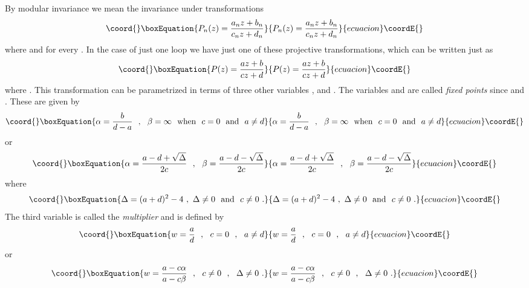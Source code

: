 \documentclass[a4paper,12pt]{article}
\begin{document}
By modular invariance we mean the invariance under transformations
\begin{equation}\coord{}\boxEquation{
P_n(z)=\frac{a_nz+b_n}{c_nz+d_n}
}{
P_n(z)=\frac{a_nz+b_n}{c_nz+d_n}
}{ecuacion}\coordE{}\end{equation}
where \coordHE{} and \coordHE{} for every \coordHE{}. In the case of just one loop we have just one of these projective transformations, which can be written just as
\begin{equation}\coord{}\boxEquation{
P(z)=\frac{az+b}{cz+d}
}{
P(z)=\frac{az+b}{cz+d}
}{ecuacion}\coordE{}\end{equation}
where \coordHE{}. This transformation can be parametrized in terms of three other variables
\myHighlight{$\alpha $}\coordHE{}, \myHighlight{$\beta $}\coordHE{} and \coordHE{}. The variables \myHighlight{$\alpha $}\coordHE{} and \myHighlight{$\beta $}\coordHE{} are called {\sl fixed
points} since \coordHE{} and \coordHE{}. These are given by
\begin{equation}\coord{}\boxEquation{
\alpha =\frac{b}{d-a}\ \ ,\ \ \beta =\infty \ \ {\rm when}\ \  c=0 \ \ {\rm and}\ \  a\neq d
}{
\alpha =\frac{b}{d-a}\ \ ,\ \ \beta =\infty \ \ {\rm when}\ \  c=0 \ \ {\rm and}\ \  a\neq d
}{ecuacion}\coordE{}\end{equation}
or
\begin{equation}\coord{}\boxEquation{
\alpha =\frac{a-d+\sqrt{\Delta }}{2c}\ \ ,\ \ \beta =\frac{a-d-\sqrt{\Delta }}{2c}
}{
\alpha =\frac{a-d+\sqrt{\Delta }}{2c}\ \ ,\ \ \beta =\frac{a-d-\sqrt{\Delta }}{2c}
}{ecuacion}\coordE{}\end{equation}
where
\begin{equation}\coord{}\boxEquation{
\Delta =(a+d)^2-4\ ,\ \Delta \neq 0 \ \ {\rm and}\ \  c\neq 0\ .
}{
\Delta =(a+d)^2-4\ ,\ \Delta \neq 0 \ \ {\rm and}\ \  c\neq 0\ .
}{ecuacion}\coordE{}\end{equation}
The third variable is called the {\sl multiplier} and is defined by
\begin{equation}\coord{}\boxEquation{
w=\frac{a}{d}\ \ ,\ \ c=0\ \ ,\ \ a\neq d
}{
w=\frac{a}{d}\ \ ,\ \ c=0\ \ ,\ \ a\neq d
}{ecuacion}\coordE{}\end{equation}
or
\begin{equation}\coord{}\boxEquation{
w=\frac{a-c\alpha }{a-c\beta }\ \ ,\ \ c\neq 0\ \ ,\ \ \Delta \neq 0\ .
}{
w=\frac{a-c\alpha }{a-c\beta }\ \ ,\ \ c\neq 0\ \ ,\ \ \Delta \neq 0\ .
}{ecuacion}\coordE{}\end{equation}
\end{document}
